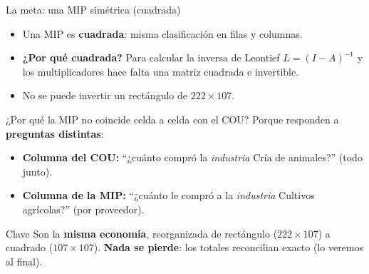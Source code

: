 \documentclass[aspectratio=169,10pt]{beamer}
\begin{document}
\begin{frame}{La meta: una MIP simétrica (cuadrada)}
  \begin{center}
  \end{center}
  \begin{itemize}
    \item Una MIP es \textbf{cuadrada}: misma clasificación en filas y columnas.
    \item \textbf{¿Por qué cuadrada?} Para calcular la inversa de Leontief $L=(I-A)^{-1}$ y los multiplicadores hace falta una matriz cuadrada e invertible.
    \item No se puede invertir un rectángulo de $222\times107$.
  \end{itemize}
\end{frame}

\begin{frame}{¿Por qué la MIP no coincide celda a celda con el COU?}
  Porque responden a \textbf{preguntas distintas}:
  \begin{itemize}
    \item \textbf{Columna del COU:} ``¿cuánto compró la \emph{industria} Cría de animales?'' (todo junto).
    \item \textbf{Columna de la MIP:} ``¿cuánto le compró a la \emph{industria} Cultivos agrícolas?'' (por proveedor).
  \end{itemize}
  \begin{alertblock}{Clave}
  Son la \textbf{misma economía}, reorganizada de rectángulo ($222\times107$) a cuadrado ($107\times107$).
  \textbf{Nada se pierde}: los totales reconcilian exacto (lo veremos al final).
  \end{alertblock}
\end{frame}
\end{document}

